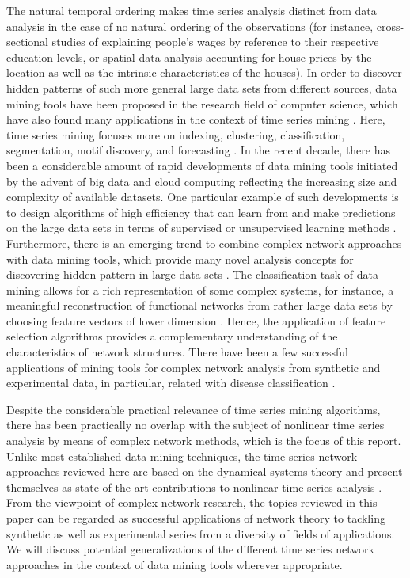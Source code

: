 The natural temporal ordering makes time series analysis distinct from data analysis in the case of no natural ordering of the observations (for instance, cross-sectional studies of explaining people's wages by reference to their respective education levels, or spatial data analysis accounting for house prices by the location as well as the intrinsic characteristics of the houses). In order to discover hidden patterns of such more general large data sets from different sources, data mining tools have been proposed in the research field of computer science, which have also found many applications in the context of time series mining \cite{Keogh2003,FU2011,Aghabozorgi2015}. Here, time series mining focuses more on indexing, clustering, classification, segmentation, motif discovery, and forecasting \cite{Keogh2003,Aghabozorgi2015}. In the recent decade, there has been a considerable amount of rapid developments of data mining tools initiated by the advent of big data and cloud computing reflecting the increasing size and complexity of available datasets. One particular example of such developments is to design algorithms of high efficiency that can learn from and make predictions on the large data sets in terms of supervised or unsupervised learning methods \cite{hurwitz2018}. Furthermore, there is an emerging trend to combine complex network approaches with data mining tools, which provide many novel analysis concepts for discovering hidden pattern in large data sets \cite{Zanin2016}. The classification task of data mining allows for a rich representation of some complex systems, for instance, a meaningful reconstruction of functional networks from rather large data sets by choosing feature vectors of lower dimension \cite{Zanin2014a}. Hence, the application of feature selection algorithms provides a complementary understanding of the characteristics of network structures. There have been a few successful applications of mining tools for complex network analysis from synthetic and experimental data, in particular, related with disease classification \cite{Zanin2014a,Karsakov2017,Whitwell2018}. 

Despite the considerable practical relevance of time series mining algorithms, there has been practically no overlap with the subject of nonlinear time series analysis by means of complex network methods, which is the focus of this report. Unlike most established data mining techniques, the time series network approaches reviewed here are based on the dynamical systems theory \cite{Ott1993,kantz1997} and present themselves as state-of-the-art contributions to nonlinear time series analysis \cite{Bradley2015c}. From the viewpoint of complex network research, the topics reviewed in this paper can be regarded as successful applications of network theory to tackling synthetic as well as experimental series from a diversity of fields of applications. We will discuss potential generalizations of the different time series network approaches in the context of data mining tools wherever appropriate.
 
